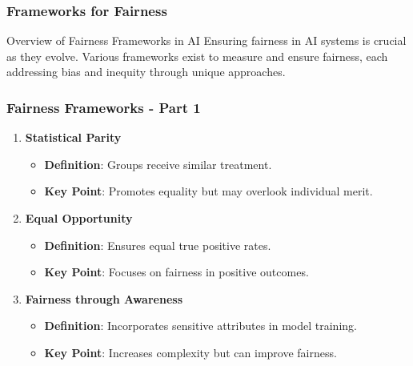 \documentclass[aspectratio=169]{beamer}
\begin{document}
\begin{frame}[fragile]
    \frametitle{Frameworks for Fairness}
    \begin{block}{Overview of Fairness Frameworks in AI}
        Ensuring fairness in AI systems is crucial as they evolve. Various frameworks exist to measure and ensure fairness, each addressing bias and inequity through unique approaches.
    \end{block}
\end{frame}

\begin{frame}[fragile]
    \frametitle{Fairness Frameworks - Part 1}
    \begin{enumerate}
        \item \textbf{Statistical Parity}
            \begin{itemize}
                \item \textbf{Definition}: Groups receive similar treatment.
                \item \textbf{Key Point}: Promotes equality but may overlook individual merit.
            \end{itemize}
        
        \item \textbf{Equal Opportunity}
            \begin{itemize}
                \item \textbf{Definition}: Ensures equal true positive rates.
                \item \textbf{Key Point}: Focuses on fairness in positive outcomes.
            \end{itemize}
        
        \item \textbf{Fairness through Awareness}
            \begin{itemize}
                \item \textbf{Definition}: Incorporates sensitive attributes in model training.
                \item \textbf{Key Point}: Increases complexity but can improve fairness.
            \end{itemize}
    \end{enumerate}
\end{frame}
\end{document}
